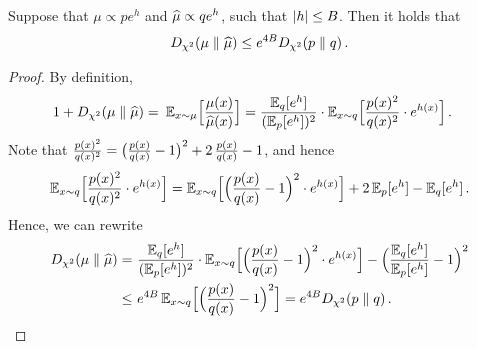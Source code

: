 \begin{lemma}\label{lem:Dchis-perturb}
Suppose that $\mu\propto pe^{h}$ and $\muhat\propto qe^{h}$, such that $\abs{h}\leq B$. Then it holds that
\begin{align*}
    \Dchis{\mu}{\muhat}\leq e^{4B}\Dchis{p}{q}\,.
\end{align*} 
\end{lemma}
\begin{proof}
By definition,
\begin{align*}
    1+\Dchis{\mu}{\muhat}
    =&~ \En_{x\sim \mu}\brk[\Big]{\frac{\mu(x)}{\muhat(x)}}
    =\frac{\En_q[e^h]}{(\En_p[e^h])^2}\cdot \En_{x\sim q}\brk[\Big]{ \frac{p(x)^2}{q(x)^2}\cdot e^{h(x)} }\,.
\end{align*}
Note that $\frac{p(x)^2}{q(x)^2}=\prn[\big]{\frac{p(x)}{q(x)}-1}^2+2\,\frac{p(x)}{q(x)}-1$, and hence
\begin{align*}
    \En_{x\sim q}\brk[\Big]{ \frac{p(x)^2}{q(x)^2}\cdot e^{h(x)} }
    =\En_{x\sim q}\brk[\Big]{ \prn[\Big]{\frac{p(x)}{q(x)}-1}^2 \cdot e^{h(x)} }+2\En_p[e^h]-\En_q[e^h]\,.
\end{align*}
Hence, we can rewrite
\begin{align*}
    \Dchis{\mu}{\muhat}
    =&~
    \frac{\En_q[e^h]}{(\En_p[e^h])^2}\cdot \En_{x\sim q}\brk[\Big]{ \prn[\Big]{\frac{p(x)}{q(x)}-1}^2 \cdot e^{h(x)} } - \prn[\Big]{\frac{\En_q[e^h]}{\En_p[e^h]}-1}^2 \\
    \leq&~ e^{4B}\En_{x\sim q}\brk[\Big]{ \prn[\Big]{\frac{p(x)}{q(x)}-1}^2  }
    =e^{4B}\Dchis{p}{q}\,.
\end{align*}
\end{proof}

